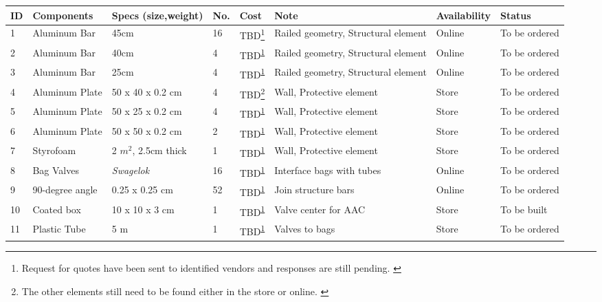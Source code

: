 \begin{longtable}{|m{}|m{}|m{}|m{}|m{}|m{}|m{}|m{}|}
     
   
\hline
\textbf{ID} & \textbf{Components} & \textbf{Specs (size,weight)} & \textbf{No.} & \textbf{Cost} & \textbf{Note} & \textbf{Availability} & \textbf{Status} \\ \hline
1 & Aluminum Bar & 45cm & 16 & TBD\footnote{Request for quotes have been sent to identified vendors and responses are still pending. \label{fn:mechcomp1}} & Railed geometry, Structural element & Online & To be ordered \\ \hline
2 & Aluminum Bar & 40cm & 4 & TBD\textsuperscript{\ref{fn:mechcomp1}} & Railed geometry, Structural element & Online & To be ordered \\ \hline
3 & Aluminum Bar & 25cm & 4 & TBD\textsuperscript{\ref{fn:mechcomp1}} & Railed geometry, Structural element & Online & To be ordered \\ \hline
4 & Aluminum Plate & 50 x 40 x 0.2 cm & 4 & TBD\footnote{The other elements still need to be found either in the store or online. \label{fn:mechcomp2}} & Wall, Protective element & Store & To be ordered \\ \hline
5 & Aluminum Plate & 50 x 25 x 0.2 cm & 4 & TBD\textsuperscript{\ref{fn:mechcomp2}} & Wall, Protective element & Store & To be ordered \\ \hline
6 & Aluminum Plate & 50 x 50 x 0.2 cm & 2 & TBD\textsuperscript{\ref{fn:mechcomp2}} & Wall, Protective element & Store & To be ordered \\ \hline
7 & Styrofoam & 2 $m^2$, 2.5cm thick & 1 & TBD\textsuperscript{\ref{fn:mechcomp2}} & Wall, Protective element & Store & To be ordered \\ \hline
8 & Bag Valves & \textit{Swagelok} & 16 & TBD\textsuperscript{\ref{fn:mechcomp1}} & Interface bags with tubes & Online & To be ordered \\ \hline
9 & 90-degree angle & 0.25 x 0.25 cm & 52 & TBD\textsuperscript{\ref{fn:mechcomp2}} & Join structure bars & Online & To be ordered \\ \hline
10 & Coated box & 10 x 10 x 3 cm & 1 & TBD\textsuperscript{\ref{fn:mechcomp2}} & Valve center for AAC & Store & To be built \\ \hline
11 & Plastic Tube & 5 m & 1 & TBD\textsuperscript{\ref{fn:mechcomp2}} & Valves to bags & Store & To be ordered \\ \hline

\end{longtable}
